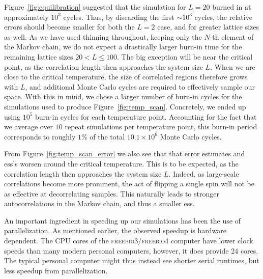 \documentclass[english,notitlepage,reprint]{revtex4-2}  %
\begin{document}
Figure~\ref{fig:equilibration} suggested that the simulation for \(L=20\) burned in at approximately \(10^3\) cycles. 
Thus, by discarding the first \(\sim 10^3\) cycles, the relative errors should become smaller for both the \(L=2\) case, and for greater lattice sizes as well.
As we have used thinning throughout, keeping only the \(N\)-th element of the Markov chain, we do not expect a drastically larger burn-in time for the remaining lattice sizes \(20<L\leq 100\). 
The big exception will be near the critical point, as the correlation length then approaches the system size \(L\).
When we are close to the critical temperature, the size of correlated regions therefore grows with \(L\), and additional Monte Carlo cycles are required to effectively sample our space.
With this in mind, we chose a larger number of burn-in cycles for the simulations used to produce Figure~\ref{fig:temp_scan}.
Concretely, we ended up using \(10^5\) burn-in cycles for each temperature point.
Accounting for the fact that we average over $10$ repeat simulations per temperature point, this burn-in period corresponds to roughly \(1\%\) of the total $10.1\times 10^6$ Monte Carlo cycles.

From Figure~\ref{fig:temp_scan_error} we also see that that error estimates and \gls{ess}'s worsen around the critical temperature.
This is to be expected, as the correlation length then approaches the system size $L$.
Indeed, as large-scale correlations become more prominent, the act of flipping a single spin will not be as effective at decorrelating samples. 
This naturally leads to stronger autocorrelations in the Markov chain, and thus a smaller \gls{ess}.

An important ingredient in speeding up our simulations has been the use of parallelization.
As mentioned earlier, the observed speedup is hardware dependent.
The CPU cores of the \textsc{freebio3}/\textsc{freebio4} computer \cite{lightweight_hpc_uio} have lower clock speeds than many modern personal computers, 
however, it does provide 24 cores.
The typical personal computer might thus instead see shorter serial runtimes, but less speedup from parallelization.
\end{document}
